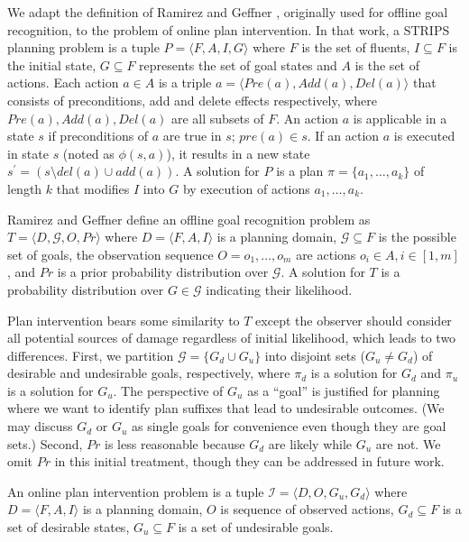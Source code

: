 We adapt the definition of Ramirez and Geffner , originally used for offline goal recognition, to the problem of online plan intervention.
In that work, a STRIPS \cite{fikes1971strips} planning problem is a tuple $ P = \langle F, A, I, G \rangle$ where $F$ is the set of fluents, $I\subseteq F$ is the initial state, $G  \subseteq F$ represents the set of goal states and $A$ is the set of actions. 
Each action $a \in A$ is a triple $a=\langle Pre(a), Add(a), Del(a)\rangle$ that consists of preconditions, add and delete effects respectively, where $Pre(a), Add(a), Del(a)$ are all subsets of $F$. 
An action $a$ is applicable in a state $s$ if preconditions of $a$ are true in $s$; $pre(a) \in s$. 
If an action $a$ is executed in state $s$ (noted as $\phi(s,a)$), it results in a new state $s^{\prime} = (s \setminus del(a) \cup add(a))$.  
A solution for $P$ is a plan $\pi = \{a_1, \dots ,a_k\}$ of length $k$ that modifies $I$ into $G$ by execution of actions $a_1, \dots ,a_k$.

Ramirez and Geffner  define an offline goal recognition problem as $T= \langle D, \mathcal{G}, O, Pr \rangle$ where $D=\langle F, A, I \rangle$ is a planning domain, $\mathcal{G} \subseteq F$ is the possible set of goals, the observation sequence $O = o_1, \ldots , o_m$ are actions $o_i \in A, i \in[1,m]$, and $Pr$ is a prior probability distribution over $\mathcal{G}$. A solution for $T$ is a probability distribution over $G \in \mathcal{G}$ indicating their likelihood.

Plan intervention bears some similarity to $T$ except the observer should consider all potential sources of damage regardless of initial likelihood, which leads to two differences.
First, we partition $\mathcal{G} = \lbrace G_d \cup G_u \rbrace$ into disjoint sets ($G_u \neq G_d$) of desirable and undesirable goals, respectively, where $\pi_d$ is a solution for $G_d$ and $\pi_u$ is a solution for $G_u$.
The perspective of $G_u$ as a ``goal'' is justified for planning where we want to identify plan suffixes that lead to undesirable outcomes.
(We may discuss $G_d$ or $G_u$ as single goals for convenience even though they are goal sets.)
Second, $Pr$ is less reasonable because $G_d$ are likely while $G_u$ are not.
We omit $Pr$ in this initial treatment, though they can be addressed in future work.

\theoremstyle{definition}
\begin{definition}
An \textnormal{online plan intervention problem} is a tuple $\mathcal{I} = \langle D, O, G_u, G_d \rangle$ where $D=\langle F, A, I \rangle$ is a planning domain, 
$O$ is  sequence of observed actions,
$G_d \subseteq F$ is a set of desirable states,
$G_u \subseteq F$ is a set of undesirable goals.
\end{definition}

